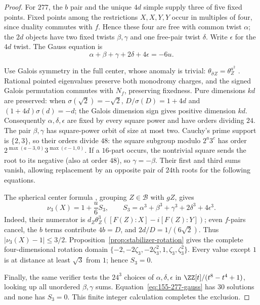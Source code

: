 \begin{proof}
For $277$, the $b$ pair and the unique $4d$ simple supply three of five
fixed points. Fixed points among the restrictions $X,X,Y,Y$ occur in
multiples of four, since duality commutes with $f$. Hence these four
are free with common twist $\alpha$; the $2d$ objects have two fixed
twists $\beta,\gamma$ and one free-pair twist $\delta$. Write
$\epsilon$ for the $4d$ twist. The Gauss equation is
\begin{equation}\label{eq:155-277-gauss}
 \alpha+\beta+\gamma+2\delta+4\epsilon=-6u.
\end{equation}

Use Galois symmetry in the full center, whose anomaly is trivial:
$\theta_{\widehat\sigma Z}=\theta_Z^{a^2}$
\cite[Theorem~II]{DLN}. Rational pointed eigenvalues preserve both
monodromy charges, and the signed Galois permutation commutes with
$N_f$, preserving fixedness. Pure dimensions $kd$ are preserved: when
$\sigma(\sqrt2)=-\sqrt2$,
$D/\sigma(D)=1+4d$ and $(1+4d)\sigma(d)=-d$;
the Galois dimension sign gives positive dimension $kd$.
Consequently $\alpha,\delta,\epsilon$ are fixed by every square power
and have orders dividing $24$. The pair $\beta,\gamma$ has square-power
orbit of size at most two. Cauchy's prime support is $\{2,3\}$, so their
orders divide $48$: the square subgroup modulo $2^a3^c$ has order
$2^{\max(a-3,0)}3^{\max(c-1,0)}$. If a $16$-part occurs, the nontrivial
square sends the root to its negative (also at order $48$), so
$\gamma=-\beta$. Their first and third sums vanish, allowing replacement
by an opposite pair of $24$th roots for the following equations.

The spherical center formula \cite[Theorem~4.1]{NS}, grouping
$Z\in\mathcal B$ with $gZ$, gives
\[
 \nu_3(X)=1+\frac{u}{6}S_3,\qquad
 S_3=\alpha^3+\beta^3+\gamma^3+2\delta^3+4\epsilon^3.
\]
Indeed, their numerator is
$d_Z\theta_Z^3([F(Z):X]-i[F(Z):Y])$; even $f$-pairs cancel,
the $b$ terms contribute $4b=D$, and $2d/D=1/(6\sqrt2)$.
Thus $|\nu_3(X)-1|\le3/2$. Proposition~\ref{prop:stabilizer-rotation}
gives the complete four-dimensional rotation domain
$\{-2,-2\zeta_3,-2\zeta_3^2,1,\zeta_3,\zeta_3^2\}$.
Every value except $1$ is at distance at least $\sqrt3$ from $1$;
hence $S_3=0$.

Finally, the same verifier tests the $24^3$ choices of
$\alpha,\delta,\epsilon$ in
$\ZZ[t]/(t^8-t^4+1)$, looking up all unordered $\beta,\gamma$ sums.
Equation~\eqref{eq:155-277-gauss} has $30$ solutions and none has
$S_3=0$. This finite integer calculation completes the exclusion.
\end{proof}

